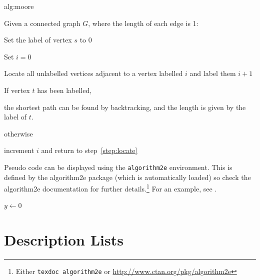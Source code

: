 \documentclass[mlmain]{jmlr}
\begin{document}
\begin{algorithm}
\floatconts
{alg:moore}%
{\caption{Moore's Shortest Path}}%
{%
Given a connected graph $G$, where the length of each edge is 1:
\begin{enumerate*}
  \item Set the label of vertex $s$ to 0
  \item Set $i=0$
  \begin{enumerate*}
    \item \label{step:locate}Locate all unlabelled vertices 
          adjacent to a vertex labelled $i$ and label them $i+1$
    \item If vertex $t$ has been labelled,
    \begin{enumerate*}
      \item[] the shortest path can be found by backtracking, and 
      the length is given by the label of $t$.
    \end{enumerate*}
    otherwise
    \begin{enumerate*}
      \item[] increment $i$ and return to step~\ref{step:locate}
    \end{enumerate*}
  \end{enumerate*}
\end{enumerate*}
}
\end{algorithm}

Pseudo code can be displayed using the \texttt{algorithm2e}
environment. This is defined by the \textsf{algorithm2e} package
(which is automatically loaded) so check the \textsf{algorithm2e}
documentation for further details.\footnote{Either \texttt{texdoc
algorithm2e} or \url{http://www.ctan.org/pkg/algorithm2e}}
For an example, see .

\begin{algorithm2e}
\caption{Computing Net Activation}
\label{alg:net}
{}
$y\leftarrow 0$\;
\end{algorithm2e}

\section{Description Lists}
\end{document}
